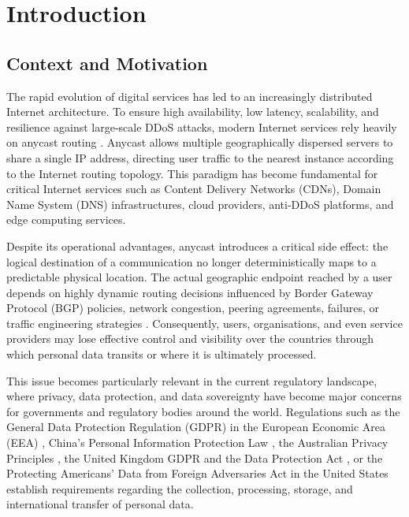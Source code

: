 \documentclass[
A4paper,                %
twoside,                %
openright,              %
chapterprefix=true,     %
12pt,                   %
headings=normal,        %
titlepage=on            %
]{book}
\begin{document}
\mainmatter
{}			%
\setcounter{page}{1}			%
\pagestyle{fancy} 	            %
\parskip=7pt                    %
\parindent=0pt                  %


 \newpage \chapter{Introduction}
\label{ch:introduction}

\section{Context and Motivation}
\label{sc:introduction_context_motivation}

The rapid evolution of digital services has led to an increasingly distributed Internet architecture. To ensure high availability, low latency, scalability, and resilience against large-scale DDoS attacks, modern Internet services rely heavily on anycast routing \cite{Abley2006OperationServices,McPherson2014ArchitecturalAnycast}. Anycast allows multiple geographically dispersed servers to share a single IP address, directing user traffic to the nearest instance according to the Internet routing topology. This paradigm has become fundamental for critical Internet services such as Content Delivery Networks (CDNs), Domain Name System (DNS) infrastructures, cloud providers, anti-DDoS platforms, and edge computing services.

Despite its operational advantages, anycast introduces a critical side effect: the logical destination of a communication no longer deterministically maps to a predictable physical location. The actual geographic endpoint reached by a user depends on highly dynamic routing decisions influenced by Border Gateway Protocol (BGP) policies, network congestion, peering agreements, failures, or traffic engineering strategies \cite{Calder2015AnalyzingCDN, Zhou2023RegionalPotentials}. Consequently, users, organisations, and even service providers may lose effective control and visibility over the countries through which personal data transits or where it is ultimately processed.

This issue becomes particularly relevant in the current regulatory landscape, where privacy, data protection, and data sovereignty have become major concerns for governments and regulatory bodies around the world. Regulations such as the General Data Protection Regulation (GDPR) in the European Economic Area (EEA) \cite{REGULATIONSRelevance}, China's Personal Information Protection Law \cite{TheTranslation}, the Australian Privacy Principles \cite{ReadOAIC}, the United Kingdom GDPR and the Data Protection Act \cite{RegulationRelevance,Data2018}, or the Protecting Americans' Data from Foreign Adversaries Act in the United States \cite{Rep.Pallone2024Text2024} establish requirements regarding the collection, processing, storage, and international transfer of personal data.
\end{document}
